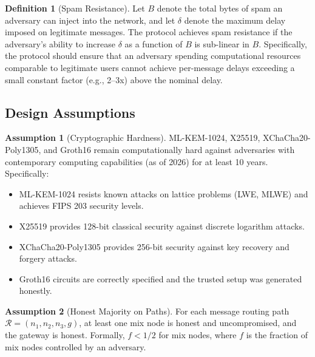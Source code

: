 \documentclass[11pt]{article}
\theoremstyle{definition}
\newtheorem{definition}{Definition}
\newtheorem{assumption}{Assumption}
\theoremstyle{remark}
\begin{document}
\begin{definition}[Spam Resistance]
\label{def:spam-resist}
Let $B$ denote the total bytes of spam an adversary can inject into the network, and let $\delta$ denote the maximum delay imposed on legitimate messages. The protocol achieves spam resistance if the adversary's ability to increase $\delta$ as a function of $B$ is sub-linear in $B$. Specifically, the protocol should ensure that an adversary spending computational resources comparable to legitimate users cannot achieve per-message delays exceeding a small constant factor (e.g., 2--3x) above the nominal delay.
\end{definition}

\subsection{Design Assumptions}

\begin{assumption}[Cryptographic Hardness]
\label{assum:crypto}
ML-KEM-1024, X25519, XChaCha20-Poly1305, and Groth16 remain computationally hard against adversaries with contemporary computing capabilities (as of 2026) for at least 10 years. Specifically:
\begin{itemize}
    \item ML-KEM-1024 resists known attacks on lattice problems (LWE, MLWE) and achieves FIPS 203 security levels.
    \item X25519 provides 128-bit classical security against discrete logarithm attacks.
    \item XChaCha20-Poly1305 provides 256-bit security against key recovery and forgery attacks.
    \item Groth16 circuits are correctly specified and the trusted setup was generated honestly.
\end{itemize}
\end{assumption}

\begin{assumption}[Honest Majority on Paths]
\label{assum:honest-majority}
For each message routing path $\mathcal{R} = (n_1, n_2, n_3, g)$, at least one mix node is honest and uncompromised, and the gateway is honest. Formally, $f < 1/2$ for mix nodes, where $f$ is the fraction of mix nodes controlled by an adversary.
\end{assumption}
\end{document}
